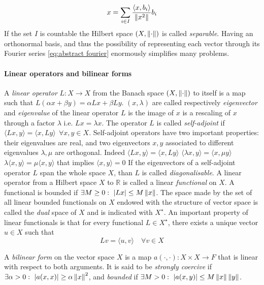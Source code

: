 \begin{equation}\label{eq:abstract fourier}
	x = \sum_{i\in I} \frac{\langle x, b_i\rangle}{\left\lVert x^2\right\rVert}b_i
\end{equation}
If the set $I$ is countable the Hilbert space $(X, \left\lVert\cdot\right\rVert)$ is called \textit{separable}. Having an orthonormal basis, and thus the possibility of representing each vector through its Fourier series \ref{eq:abstract fourier} enormously simplifies many problems.

\paragraph{Linear operators and bilinear forms} A \textit{linear operator} $L: X\to X$ from the Banach space $(X, \left\lVert\cdot\right\rVert)$ to itself is a map such that $L(\alpha x + \beta y) = \alpha L x + \beta L y$. $(x, \lambda)$ are called respectively \textit{eigenvector} and \textit{eigenvalue} of the linear operator $L$ is the image of $x$ is a rescaling of $x$ through a factor $\lambda$ i.e. $Lx = \lambda x$. The operator $L$ is called \textit{self-adjoint} if $\langle Lx, y\rangle = \langle x,Ly\rangle\ \  \forall x,y \in X$. Self-adjoint operators have two important properties: their eigenvalues are real, and two eigenvectors $x, y$ associated to different eigenvalues $\lambda, \mu$ are orthogonal. Indeed 
$\langle Lx, y\rangle = \langle x,Ly\rangle$
$\langle \lambda x, y\rangle = \langle x,\mu y\rangle$
$\lambda \langle  x, y\rangle = \mu \langle x, y\rangle$
that implies $ \langle  x, y\rangle = 0$
If the eigenvectors of a self-adjoint operator $L$ span the whole space $X$, than $L$ is called \textit{diagonalisable}.  A linear operator from a Hilbert space $X$ to $\mathbb R$ is called a linear \textit{functional} on $X$. A functional is bounded if $\exists M\geq 0: \ |Lx|\leq M\norm x$. The space made by the set of all linear bounded functionals on $X$ endowed with the structure of vector space is called the \textit{dual} space of $X$ and is indicated with $X^\star$. An important property of linear functionals is that for every functional $L\in X^\star$, there exists a unique vector $u\in X$ such that
$$Lv = \langle u, v\rangle\quad \forall v\in X$$ 

A \textit{bilinear form} on the vector space $X$ is a map $a(\cdot, \cdot): X\times X\to F$ that is linear with respect to both arguments. It is said to be \textit{strongly coercive} if $\exists\alpha>0:\ |a(x, x)|\geq \alpha \left\lVert x\right\rVert^2$, and \textit{bounded} if $\exists M>0:\ |a(x, y)|\leq M \left\lVert x\right\rVert \left\lVert y\right\rVert$.

